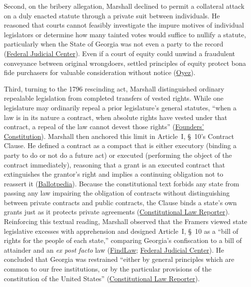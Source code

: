 \documentclass[12pt]{article}
\begin{document}
Second, on the bribery allegation, Marshall declined to permit a collateral attack on a duly enacted statute through a private suit between individuals. He reasoned that courts cannot feasibly investigate the impure motives of individual legislators or determine how many tainted votes would suffice to nullify a statute, particularly when the State of Georgia was not even a party to the record (\href{https://www.fjc.gov/history/cases/cases-that-shaped-the-federal-courts/fletcher-v-peck}{Federal Judicial Center}). Even if a court of equity could unwind a fraudulent conveyance between original wrongdoers, settled principles of equity protect bona fide purchasers for valuable consideration without notice (\href{https://www.oyez.org/cases/1789-1850/10us87}{Oyez}).

Third, turning to the 1796 rescinding act, Marshall distinguished ordinary repealable legislation from completed transfers of vested rights. While one legislature may ordinarily repeal a prior legislature's general statutes, ``when a law is in its nature a contract, when absolute rights have vested under that contract, a repeal of the law cannot devest those rights'' (\href{https://press-pubs.uchicago.edu/founders/documents/a1_10_1s12.html}{Founders' Constitution}). Marshall then anchored this limit in Article~I, \S~10's Contract Clause. He defined a contract as a compact that is either executory (binding a party to do or not do a future act) or executed (performing the object of the contract immediately), reasoning that a grant is an executed contract that extinguishes the grantor's right and implies a continuing obligation not to reassert it (\href{https://ballotpedia.org/Fletcher_v._Peck}{Ballotpedia}). Because the constitutional text forbids any state from passing any law impairing the obligation of contracts without distinguishing between private contracts and public contracts, the Clause binds a state's own grants just as it protects private agreements (\href{https://constitutionallawreporter.com/2015/06/16/fletcher-v-peck-contract-clause/}{Constitutional Law Reporter}). Reinforcing this textual reading, Marshall observed that the Framers viewed state legislative excesses with apprehension and designed Article~I, \S~10 as a ``bill of rights for the people of each state,'' comparing Georgia's confiscation to a bill of attainder and an \textit{ex post facto} law (\href{https://caselaw.findlaw.com/court/us-supreme-court/10/87.html}{FindLaw}; \href{https://www.fjc.gov/history/cases/cases-that-shaped-the-federal-courts/fletcher-v-peck}{Federal Judicial Center}). He concluded that Georgia was restrained ``either by general principles which are common to our free institutions, or by the particular provisions of the constitution of the United States'' (\href{https://constitutionallawreporter.com/2015/06/16/fletcher-v-peck-contract-clause/}{Constitutional Law Reporter}).
\end{document}
